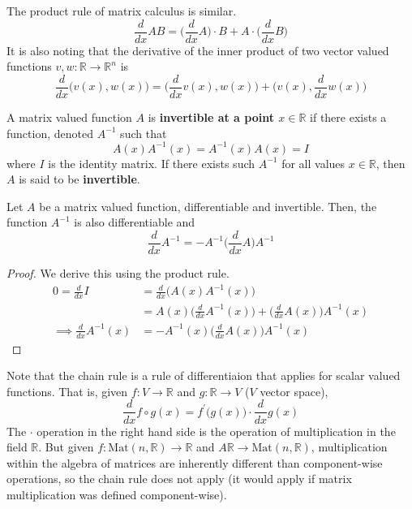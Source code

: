   The product rule of matrix calculus is similar.
  \begin{equation}
    \frac{d}{d x} A B = \bigg(\frac{d}{d x} A\bigg) \cdot B + A \cdot \bigg(\frac{d}{d x} B \bigg)
  \end{equation}
  It is also noting that the derivative of the inner product of two vector valued functions $v, w: \mathbb{R} \longrightarrow \mathbb{R}^n$ is 
  \begin{equation}
    \frac{d}{d x} \big( v(x), w(x) \big) = \Big( \frac{d}{d x} v(x), w(x) \Big) + \Big( v(x), \frac{d}{d x} w(x) \Big)
  \end{equation}

  \begin{definition}
    A matrix valued function $A$ is \textbf{invertible at a point $x \in \mathbb{R}$} if there exists a function, denoted $A^{-1}$ such that
    \begin{equation}
      A(x) A^{-1} (x) = A^{-1}(x) A(x) = I
    \end{equation}
    where $I$ is the identity matrix. If there exists such $A^{-1}$ for all values $x \in \mathbb{R}$, then $A$ is said to be \textbf{invertible}. 
  \end{definition}

  \begin{theorem}
    Let $A$ be a matrix valued function, differentiable and invertible. Then, the function $A^{-1}$ is also differentiable and 
    \begin{equation}
      \frac{d}{d x} A^{-1} = - A^{-1} \bigg( \frac{d}{d x} A \bigg) A^{-1}
    \end{equation}
  \end{theorem}
  \begin{proof}
    We derive this using the product rule. 
    \begin{align*}
      0 = \frac{d}{d x} I & = \frac{d}{d x} \big( A(x) A^{-1} (x) \big) \\
      & = A(x) \bigg(\frac{d}{d x} A^{-1} (x) \bigg) + \bigg( \frac{d}{d x} A(x) \bigg) A^{-1} (x) \\
      \implies \frac{d}{d x} A^{-1} (x) & = - A^{-1} (x) \bigg( \frac{d}{d x} A(x) \bigg) A^{-1}(x)
    \end{align*}
  \end{proof}
  Note that the chain rule is a rule of differentiaion that applies for scalar valued functions. That is, given $f: V \longrightarrow \mathbb{R}$ and $g: \mathbb{R} \longrightarrow V$ ($V$ vector space), 
  \begin{equation}
    \frac{d}{d x} f \circ g (x) = f^\prime \big( g(x) \big) \cdot \frac{d}{d x} g(x)
  \end{equation}
  The $\cdot$ operation in the right hand side is the operation of multiplication in the field $\mathbb{R}$. But given $f: \text{Mat}(n, \mathbb{R}) \longrightarrow \mathbb{R}$ and $A \mathbb{R} \longrightarrow \text{Mat}(n, \mathbb{R})$, multiplication within the algebra of matrices are inherently different than component-wise operations, so the chain rule does not apply (it would apply if matrix multiplication was defined component-wise). 

